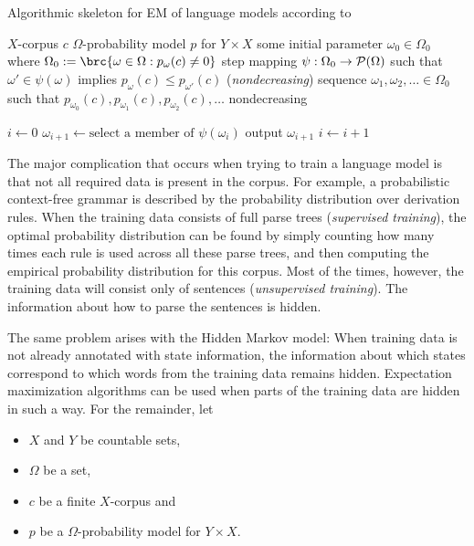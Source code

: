 \begin{algorithm}[t]
 \caption{Algorithmic skeleton for EM of language models according to \cite{bucstuvog15}}
 \label{alg:skeleton}
 \begin{algorithmic}[1]
  \algorithmheader[Input:] $X$-corpus $c$
  \algorithmheader         $\Omega$-probability model $p$ for $Y\times X$
  \algorithmheader         some initial parameter $\omega_0 \in \Omega_0$ where $\Omega_0 := \brc{\omega\in\Omega: p_\omega(c) \neq 0}$
  \algorithmheader[Implicit:] step mapping $\psi:\Omega_0\to\mathcal P(\Omega)$
  \algorithmheader            \hspace{1em} such that $\omega'\in\psi(\omega)$ implies $p_\omega(c) \leq p_{\omega'}(c)$ (\emph{nondecreasing})
  \algorithmheader[Output:] sequence $\omega_1,\omega_2,\ldots\in\Omega_0$
  \algorithmheader            \hspace{1em} such that $p_{\omega_0}(c), p_{\omega_1}(c), p_{\omega_2}(c),\ldots$ nondecreasing

  \STATE $i\leftarrow 0$
   \STATE $\omega_{i+1} \leftarrow \text{select a member of $\psi(\omega_i)$}$
   \STATE output $\omega_{i+1}$
   \STATE $i\leftarrow i+1$
  \ENDWHILE
 \end{algorithmic}
\end{algorithm}

The major complication that occurs when trying to train a language
model is that not all required data is present in the corpus. For example, a
probabilistic context-free grammar is described by the probability distribution
over derivation rules. \cite{laryou90} When the training data consists of full
parse trees (\emph{supervised training}), the optimal probability distribution
can be found by simply counting how many times each rule is used across all
these parse trees, and then computing the empirical probability distribution
for this corpus. Most of the times, however, the training data will consist
only of sentences (\emph{unsupervised training}). The information about how to
parse the sentences is hidden.

The same problem arises with the Hidden Markov model: When training data is not
already annotated with state information, the information about which states
correspond to which words from the training data remains hidden. Expectation
maximization algorithms can be used when parts of the training data are hidden
in such a way. For the remainder, let\label{02-basic-requirements}
\begin{itemize}\setlength\itemsep{-0.3em}
 \item $X$ and $Y$ be countable sets,
 \item $\Omega$ be a set,
 \item $c$ be a finite $X$-corpus and
 \item $p$ be a $\Omega$-probability model for $Y\times X$.
\end{itemize}

